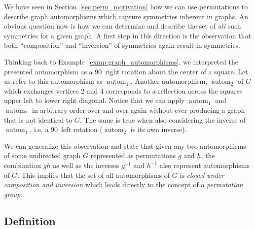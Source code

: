 We have seen in Section~\ref{sec:perm_motivation} how we can use permutations
to describe graph automorphisms which capture symmetries inherent in graphs.
%
An obvious question now is how we can determine and describe the set of
\textit{all} such symmetries for a given graph. A first step in this direction
is the observation that both ``composition'' and ``inversion'' of symmetries
again result in symmetries.

Thinking back to Example~\ref{exmp:graph_automorphisms}, we interpreted the
presented automorphism as a 90\degree\ right rotation about the center of a
square. Let us refer to this automorphism as $\operatorname{autom}_1$.  Another
automorphism, $\operatorname{autom}_2$ of $G$ which exchanges vertices $2$ and
$4$ corresponds to a reflection across the squares upper left to lower right
diagonal.
%
Notice that we can apply $\operatorname{autom}_1$ and $\operatorname{autom}_2$
in arbitrary order over and over again without ever producing a graph that is
not identical to $G$. The same is true when also considering the inverse of
$\operatorname{autom}_1$, i.e. a 90\degree\ left rotation
($\operatorname{autom}_2$ is its own inverse).

We can generalize this observation and state that given any two
automorphisms of some undirected graph $G$ represented as permutations $g$ and
$h$, the combination $g h$ as well as the inverses $g^{-1}$ and $h^{-1}$ also
represent automorphisms of $G$.
%
This implies that the set of all automorphisms of $G$ is \textit{closed under
composition and inversion} which leads directly to the concept of a
\textit{permutation group}.

\subsection{Definition}
\label{subsec:pg_definition}

